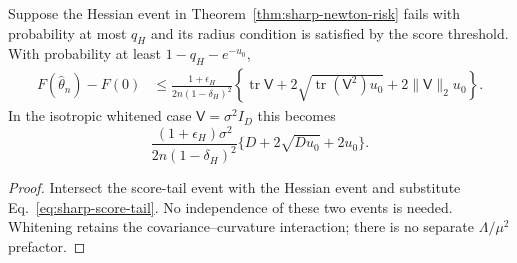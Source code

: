 \begin{corollary}
\label{cor:sharp-risk-tail}
Suppose the Hessian event in Theorem~\ref{thm:sharp-newton-risk}
fails with probability at most $q_H$ and its radius condition is
satisfied by the score threshold. With probability at least
$1-q_H-e^{-u_0}$,
\begin{align}
F(\widehat\theta_n)-F(0)
&\leq\frac{1+\epsilon_H}{2n(1-\delta_H)^2}
\left\{\operatorname{tr}\mathsf V
+2\sqrt{\operatorname{tr}(\mathsf V^2)u_0}
+2\|\mathsf V\|_2u_0\right\}.
\label{eq:sharp-risk-tail}
\end{align}
In the isotropic whitened case $\mathsf V=\sigma^2I_D$ this becomes
\begin{equation}
\frac{(1+\epsilon_H)\sigma^2}
{2n(1-\delta_H)^2}\{D+2\sqrt{Du_0}+2u_0\}.
\label{eq:sharp-isotropic-tail}
\end{equation}
\end{corollary}
\begin{proof}
Intersect the score-tail event with the Hessian event and substitute
Eq.~\eqref{eq:sharp-score-tail}. No independence of these two events
is needed. Whitening retains the covariance--curvature interaction;
there is no separate $\Lambda/\mu^2$ prefactor.
\end{proof}

